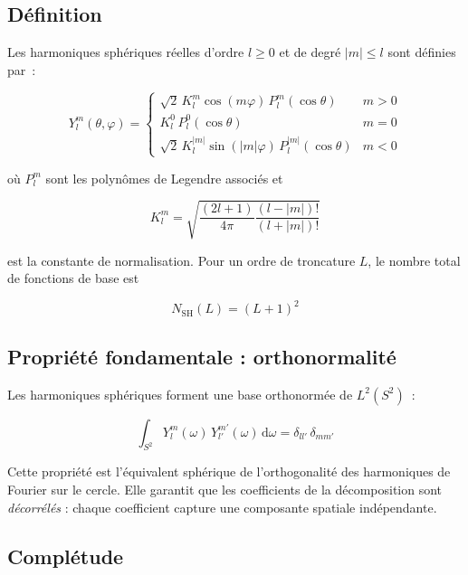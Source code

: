 \documentclass[12pt, a4paper]{article}
\begin{document}
\subsection{Définition}

Les harmoniques sphériques réelles d'ordre $l \geq 0$ et de degré $|m| \leq l$
sont définies par~:

\begin{equation}
    Y_l^m(\theta, \varphi) =
    \begin{cases}
        \sqrt{2}\, K_l^m \cos(m\varphi)\, P_l^m(\cos\theta) & m > 0 \\
        K_l^0\, P_l^0(\cos\theta)                            & m = 0 \\
        \sqrt{2}\, K_l^{|m|} \sin(|m|\varphi)\, P_l^{|m|}(\cos\theta) & m < 0
    \end{cases}
\end{equation}

où $P_l^m$ sont les polynômes de Legendre associés et

\begin{equation}
    K_l^m = \sqrt{\frac{(2l+1)}{4\pi} \frac{(l-|m|)!}{(l+|m|)!}}
\end{equation}

est la constante de normalisation. Pour un ordre de troncature $L$, le nombre total
de fonctions de base est

\begin{equation}
    \boxed{N_{\mathrm{SH}}(L) = (L+1)^2}
\end{equation}

\subsection{Propriété fondamentale : orthonormalité}

Les harmoniques sphériques forment une base orthonormée de $L^2(S^2)$~:

\begin{equation}
    \int_{S^2} Y_l^m(\omega)\, Y_{l'}^{m'}(\omega)\, \mathrm{d}\omega
    = \delta_{ll'}\, \delta_{mm'}
    \label{eq:ortho}
\end{equation}

Cette propriété est l'équivalent sphérique de l'orthogonalité des harmoniques
de Fourier sur le cercle. Elle garantit que les coefficients de la décomposition
sont \emph{décorrélés} : chaque coefficient capture une composante spatiale
indépendante.

\subsection{Complétude}
\end{document}
